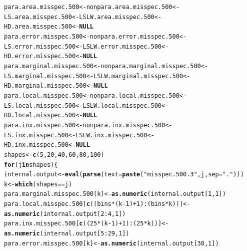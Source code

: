 \documentclass[11pt]{article}\usepackage[]{graphicx}\usepackage[]{color}
\makeatletter
\newcommand{\hlnum}[1]{\textcolor[rgb]{0.686,0.059,0.569}{#1}}%
\newcommand{\hlstr}[1]{\textcolor[rgb]{0.192,0.494,0.8}{#1}}%
\newcommand{\hlopt}[1]{\textcolor[rgb]{0,0,0}{#1}}%
\newcommand{\hlstd}[1]{\textcolor[rgb]{0.345,0.345,0.345}{#1}}%
\newcommand{\hlkwa}[1]{\textcolor[rgb]{0.161,0.373,0.58}{\textbf{#1}}}%
\newcommand{\hlkwb}[1]{\textcolor[rgb]{0.69,0.353,0.396}{#1}}%
\newcommand{\hlkwc}[1]{\textcolor[rgb]{0.333,0.667,0.333}{#1}}%
\newcommand{\hlkwd}[1]{\textcolor[rgb]{0.737,0.353,0.396}{\textbf{#1}}}%
\newenvironment{kframe}{%
 \def\at@end@of@kframe{}%
 \ifinner\ifhmode%
  \def\at@end@of@kframe{\end{minipage}}%
  \begin{minipage}{\columnwidth}%
 \fi\fi%
 \def\FrameCommand##1{\hskip\@totalleftmargin \hskip-\fboxsep
 \colorbox{shadecolor}{##1}\hskip-\fboxsep
     \hskip-\linewidth \hskip-\@totalleftmargin \hskip\columnwidth}%
 \MakeFramed {\advance\hsize-\width
   \@totalleftmargin\z@ \linewidth\hsize
   \@setminipage}}%
 {\par\unskip\endMakeFramed%
 \at@end@of@kframe}
\newenvironment{knitrout}{}{} %
\makeatother
\begin{document}
\begin{knitrout}
\color{fgcolor}\begin{kframe}
\begin{alltt}
\hlstd{para.area.misspec.500} \hlkwb{<-} \hlstd{nonpara.area.misspec.500} \hlkwb{<-}
  \hlstd{LS.area.misspec.500} \hlkwb{<-} \hlstd{LSLW.area.misspec.500} \hlkwb{<-}
  \hlstd{HD.area.misspec.500} \hlkwb{<-} \hlkwa{NULL}
\hlstd{para.error.misspec.500} \hlkwb{<-} \hlstd{nonpara.error.misspec.500} \hlkwb{<-}
  \hlstd{LS.error.misspec.500} \hlkwb{<-} \hlstd{LSLW.error.misspec.500} \hlkwb{<-}
  \hlstd{HD.error.misspec.500} \hlkwb{<-} \hlkwa{NULL}
\hlstd{para.marginal.misspec.500} \hlkwb{<-} \hlstd{nonpara.marginal.misspec.500} \hlkwb{<-}
  \hlstd{LS.marginal.misspec.500} \hlkwb{<-} \hlstd{LSLW.marginal.misspec.500} \hlkwb{<-}
  \hlstd{HD.marginal.misspec.500} \hlkwb{<-} \hlkwa{NULL}
\hlstd{para.local.misspec.500} \hlkwb{<-} \hlstd{nonpara.local.misspec.500} \hlkwb{<-}
  \hlstd{LS.local.misspec.500} \hlkwb{<-} \hlstd{LSLW.local.misspec.500} \hlkwb{<-}
  \hlstd{HD.local.misspec.500} \hlkwb{<-} \hlkwa{NULL}
\hlstd{para.inx.misspec.500} \hlkwb{<-} \hlstd{nonpara.inx.misspec.500} \hlkwb{<-}
  \hlstd{LS.inx.misspec.500} \hlkwb{<-} \hlstd{LSLW.inx.misspec.500} \hlkwb{<-}
  \hlstd{HD.inx.misspec.500} \hlkwb{<-} \hlkwa{NULL}
\hlstd{shapes} \hlkwb{<-} \hlkwd{c}\hlstd{(}\hlnum{5}\hlstd{,} \hlnum{20}\hlstd{,} \hlnum{40}\hlstd{,} \hlnum{60}\hlstd{,} \hlnum{80}\hlstd{,} \hlnum{100}\hlstd{)}
\hlkwa{for}\hlstd{(j} \hlkwa{in} \hlstd{shapes )\{}
  \hlstd{internal.output} \hlkwb{<-} \hlkwd{eval}\hlstd{(}\hlkwd{parse}\hlstd{(}\hlkwc{text}\hlstd{=}\hlkwd{paste}\hlstd{(}\hlstr{"misspec.500.3"}\hlstd{, j,} \hlkwc{sep} \hlstd{=} \hlstr{"."}\hlstd{)))}
  \hlstd{k} \hlkwb{<-} \hlkwd{which}\hlstd{(shapes} \hlopt{==} \hlstd{j)}
  \hlstd{para.marginal.misspec.500[k]} \hlkwb{<-} \hlkwd{as.numeric}\hlstd{(internal.output[}\hlnum{1}\hlstd{,} \hlnum{1}\hlstd{])}
  \hlstd{para.local.misspec.500[}\hlkwd{c}\hlstd{((bins}\hlopt{*}\hlstd{(k}\hlopt{-}\hlnum{1}\hlstd{)}\hlopt{+}\hlnum{1}\hlstd{)}\hlopt{:}\hlstd{(bins}\hlopt{*}\hlstd{k))]} \hlkwb{<-}
    \hlkwd{as.numeric}\hlstd{(internal.output[}\hlnum{2}\hlopt{:}\hlnum{4}\hlstd{,} \hlnum{1}\hlstd{])}
  \hlstd{para.inx.misspec.500[}\hlkwd{c}\hlstd{((}\hlnum{25}\hlopt{*}\hlstd{(k}\hlopt{-}\hlnum{1}\hlstd{)}\hlopt{+}\hlnum{1}\hlstd{)}\hlopt{:}\hlstd{(}\hlnum{25}\hlopt{*}\hlstd{k))]} \hlkwb{<-}
    \hlkwd{as.numeric}\hlstd{(internal.output[}\hlnum{5}\hlopt{:}\hlnum{29}\hlstd{,} \hlnum{1}\hlstd{])}
  \hlstd{para.error.misspec.500[k]} \hlkwb{<-} \hlkwd{as.numeric}\hlstd{(internal.output[}\hlnum{30}\hlstd{,} \hlnum{1}\hlstd{])}

\end{alltt}
\end{kframe}
\end{knitrout}
\end{document}
